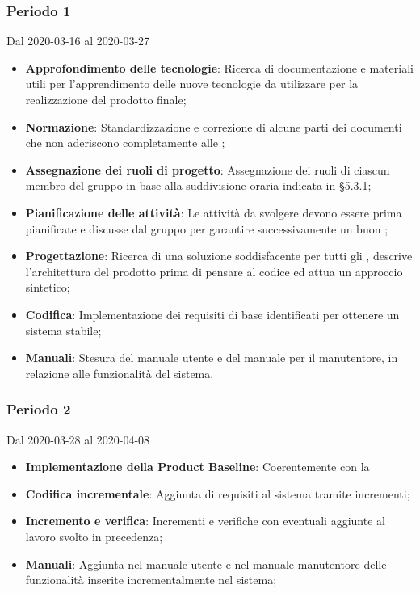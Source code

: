 \subsubsection{Periodo 1} 
Dal 2020-03-16 al 2020-03-27\\
\begin{itemize}
	\item \textbf{Approfondimento delle tecnologie}: Ricerca di documentazione e materiali utili per l'apprendimento delle nuove tecnologie da utilizzare per la realizzazione del prodotto finale;
	\item \textbf{Normazione}: Standardizzazione e correzione di alcune parti dei documenti che non aderiscono completamente alle \NdP{};
	\item \textbf{Assegnazione dei ruoli di progetto}: Assegnazione dei ruoli di ciascun membro del gruppo in base alla suddivisione oraria indicata in §5.3.1;
	\item \textbf{Pianificazione delle attività}: Le attività da svolgere devono essere prima pianificate e discusse dal gruppo per garantire successivamente un buon ;
	\item \textbf{Progettazione}: Ricerca di una soluzione soddisfacente per tutti gli , descrive l'architettura del prodotto prima di pensare al codice ed attua un approccio sintetico;
	\item \textbf{Codifica}: Implementazione dei requisiti di base identificati per ottenere un sistema stabile;
	\item \textbf{Manuali}: Stesura del manuale utente e del manuale per il manutentore, in relazione alle funzionalità del sistema.
\end{itemize}
\subsubsection{Periodo 2} 
Dal 2020-03-28 al 2020-04-08\\
\begin{itemize}
	\item \textbf{Implementazione della Product Baseline}: Coerentemente con la  
	\item \textbf{Codifica incrementale}: Aggiunta di requisiti al sistema tramite incrementi;
	\item \textbf{Incremento e verifica}: Incrementi e verifiche con eventuali aggiunte al lavoro svolto in precedenza;
	\item \textbf{Manuali}: Aggiunta nel manuale utente e nel manuale manutentore delle funzionalità inserite incrementalmente nel sistema;
\end{itemize}
